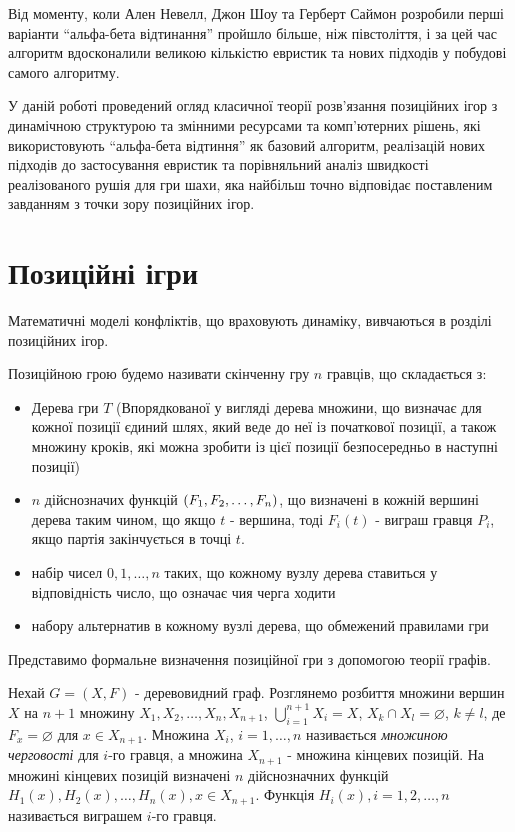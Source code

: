 \documentclass[12pt,a4paper]{article}
\begin{document}
Від моменту, коли  Ален Невелл, Джон Шоу та Герберт Саймон розробили перші
варіанти ``альфа-бета відтинання'' пройшло більше, ніж півстоліття, і за цей
час алгоритм вдосконалили великою кількістю евристик та нових підходів у
побудові самого алгоритму.

У даній роботі проведений огляд класичної теорії розв'язання позиційних ігор з
динамічною структурою та змінними ресурсами та комп'ютерних рішень, які
використовують ``альфа-бета відтиння'' як базовий алгоритм, реалізацій нових
підходів до застосування евристик та порівняльний аналіз швидкості
реалізованого рушія для гри шахи, яка найбільш точно відповідає поставленим
завданням з точки зору позиційних ігор.


\clearpage

\section{Позиційні ігри}

Математичні моделі конфліктів, що враховують динаміку, вивчаються в розділі
позиційних ігор. 

Позиційною грою будемо називати скінченну гру $n$ гравців, що складається з:
\begin{itemize}
\item Дерева гри $T$ (Впорядкованої у вигляді дерева множини, що визначає для
  кожної позиції єдиний шлях, який веде до неї із початкової позиції, а також
  множину кроків, які можна зробити із цієї позиції безпосередньо в наступні
  позиції)
\item $n$ дійснозначих функцій $(F_1,F_2,\dots,F_n)$, що визначені в кожній вершині
  дерева таким чином, що якщо $t$ - вершина, тоді $F_i(t)$ - виграш гравця
  $P_i$, якщо партія закінчується в точці $t$.
\item набір чисел $0,1,\dots,n$ таких, що кожному вузлу дерева ставиться у
  відповідність число, що означає чия черга ходити
\item набору альтернатив в кожному вузлі дерева, що обмежений правилами гри
\end{itemize}

Представимо формальне визначення позиційної гри з допомогою теорії
графів. \cite{petr}

Нехай $G=(X,F)$ - деревовидний граф. Розглянемо розбиття множини вершин $X$ на
$n+1$ множину $X_1,X_2,\dots,X_n,X_{n+1}$,
$\displaystyle\bigcup_{i=1}^{n+1}X_i=X$, $X_k \cap X_l = \varnothing$, $k \ne
l$, де $F_x=\varnothing$ для $x \in X_{n+1}$. Множина $X_i$, $i=1,\dots,n$
називається \textit{множиною черговості} для $i$-го гравця, а множина
$X_{n+1}$ - множина кінцевих позицій. На множині кінцевих позицій визначені
$n$ дійснозначних функцій $H_1(x),H_2(x),\dots,H_n(x), x \in X_{n+1}$. Функція
$H_i(x), i=1,2,\dots,n$ називається виграшем $i$-го гравця.
\end{document}
